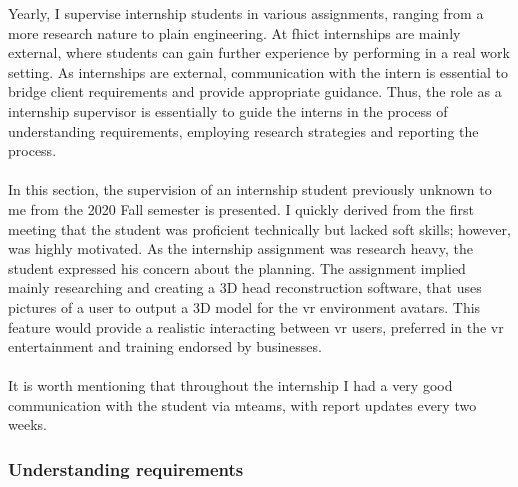 Yearly, I supervise internship students in various assignments, ranging from a more research nature to plain engineering. At \acrshort{fhict} internships are mainly external, where students can gain further experience by performing in a real work setting.
As internships are external, communication with the intern is essential to bridge client requirements and provide appropriate guidance.
Thus, the role as a internship supervisor is essentially to guide the interns in the process of understanding requirements, employing research strategies and reporting the process. 
\\\\
In this section, the supervision of an internship student previously unknown to me from the 2020 Fall semester is presented. 
I quickly derived from the first meeting that the student was proficient technically but lacked soft skills; however, was highly motivated. 
As the internship assignment was research heavy, the student expressed his concern about the planning. 
The assignment implied mainly researching  and creating a 3D head reconstruction  software, that uses pictures  of a  user  to output a 3D model for the \acrshort{vr} environment avatars. 
This feature would provide a realistic interacting between \acrshort{vr} users, preferred in the \acrshort{vr} entertainment and training endorsed by businesses.\\\\  
It is worth mentioning that throughout the internship I had a very good communication with the student via \Gls{mteams}, with report updates every two weeks.

\subsubsection{Understanding requirements}

